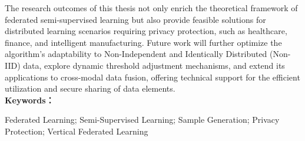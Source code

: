 The research outcomes of this thesis not only enrich the theoretical framework of federated semi-supervised learning but also provide feasible solutions for distributed learning scenarios requiring privacy protection, such as healthcare, finance, and intelligent manufacturing. Future work will further optimize the algorithm’s adaptability to Non-Independent and Identically Distributed (Non-IID) data, explore dynamic threshold adjustment mechanisms, and extend its applications to cross-modal data fusion, offering technical support for the efficient utilization and secure sharing of data elements.
\\


\noindent\textbf{Keywords：} 
\begin{minipage}[t]{0.85\linewidth}
	Federated Learning; Semi-Supervised Learning; Sample Generation; Privacy Protection; Vertical Federated Learning
\end{minipage}

\clearpage